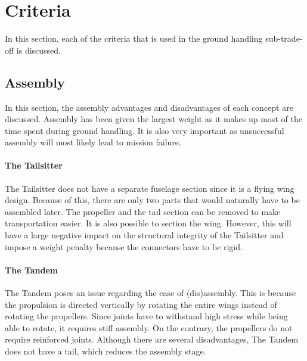 \section{Criteria}
In this section, each of the criteria that is used in the ground handling sub-trade-off is discussed.

\subsection{Assembly}
In this section, the assembly advantages and disadvantages of each concept are discussed. Assembly has been given the largest weight as it makes up most of the time spent during ground handling. It is also very important as unsuccessful assembly will most likely lead to mission failure.


\paragraph{The Tailsitter} 
The Tailsitter does not have a separate fuselage section since it is a flying wing design. Because of this, there are only two parts that would naturally have to be assembled later. The propeller and the tail section can be removed to make transportation easier. It is also possible to section the wing. However, this will have a large negative impact on the structural integrity of the Tailsitter and impose a weight penalty because the connectors have to be rigid.


\paragraph{The Tandem} 
The Tandem poses an issue regarding the ease of (dis)assembly. This is because the propulsion is directed vertically by rotating the entire wings instead of rotating the propellers. Since joints have to withstand high stress while being able to rotate, it requires stiff assembly. On the contrary, the propellers do not require reinforced joints. 
Although there are several disadvantages, The Tandem does not have a tail, which reduces the assembly stage. 




